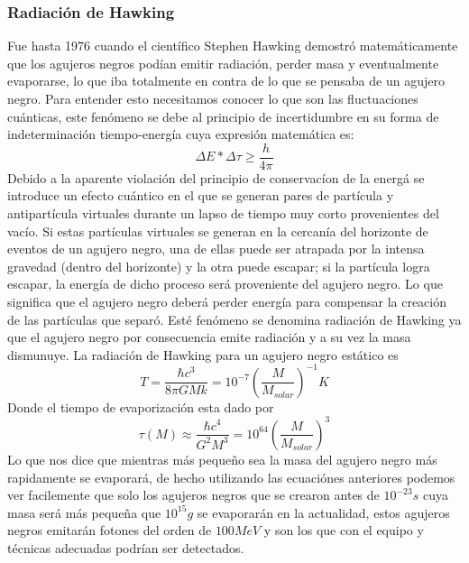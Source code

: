 \documentclass{article}
\begin{document}
\subsubsection*{Radiaci\'on de Hawking}
Fue hasta 1976 cuando el cient\'ifico Stephen Hawking demostr\'o matem\'aticamente que los agujeros negros pod\'ian emitir radiaci\'on, perder masa y eventualmente evaporarse, lo que iba totalmente en contra de lo que se pensaba de un agujero negro. 
Para entender esto necesitamos conocer lo que son las fluctuaciones cu\'anticas, este fen\'omeno se debe al principio de incertidumbre en su forma de indeterminaci\'on tiempo-energ\'ia cuya expresi\'on matem\'atica es:
\begin{equation}
\Delta{E}*\Delta{\tau}\geq\frac{h}{4\pi}
\end{equation}
Debido a la aparente violaci\'on del principio de conservac\'ion de la energ\'a se introduce un efecto cu\'antico en el que se generan pares de part\'icula y antipart\'icula virtuales durante un lapso de tiempo muy corto provenientes del vac\'io. 
Si estas part\'iculas virtuales se generan en la cercan\'ia del horizonte de eventos de un agujero negro, una de ellas puede ser atrapada por la intensa gravedad (dentro del horizonte) y la otra puede escapar; si la part\'icula logra escapar, la energ\'ia de dicho proceso ser\'a proveniente del agujero negro. Lo que significa que el agujero negro deber\'a perder energ\'ia para compensar la creaci\'on de las part\'iculas que separ\'o. Est\'e fen\'omeno se denomina radiaci\'on de Hawking ya que el agujero negro por consecuencia emite radiaci\'on y a su vez la masa dismunuye.
La radiaci\'on de Hawking para un agujero negro est\'atico es
\begin{equation}
T=\frac{\hbar c^{3}}{8 \pi G M k}=10^{-7} \left(\frac{M}{M_{solar}}\right)^{-1} K
\end{equation}
Donde el tiempo de evaporizaci\'on esta dado por 
\begin{equation}
\tau(M)\approx \frac{\hbar c^{4}}{G^{2} M^{3}}=10^{64} \left(\frac{M}{M_{solar}}\right)^{3}
\end{equation}
Lo que nos dice que mientras m\'as peque\~no sea la masa del agujero negro m\'as rapidamente se evaporar\'a, de hecho utilizando las ecuaci\'ones anteriores podemos ver facilemente que solo los agujeros negros que se crearon antes de $10^{-23} s$ cuya masa ser\'a m\'as peque\~na que $10^{15} g$ se evaporar\'an en la actualidad, estos agujeros negros emitar\'an fotones del orden de $100 MeV$ y son los que con el equipo y t\'ecnicas adecuadas podr\'ian ser detectados.
\end{document}
